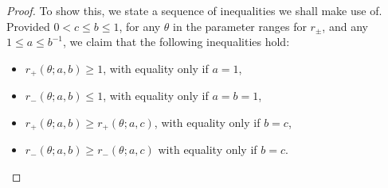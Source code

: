\documentclass[10pt,a4paper]{amsart}
\numberwithin{equation}{section}
\begin{document}
\begin{proof}
To show this, we state a sequence of inequalities we shall make use of. Provided $0 < c \leq b \leq 1$, for any $\theta$ in the parameter ranges for $r_{\pm}$, and any $1 \leq a \leq b^{-1}$, we claim that the following inequalities hold:
 \begin{itemize}\itemsep=0pt\samepage
 \item[$(i)$] $r_+(\theta;a,b) \geq 1$, with equality only if $a=1$,
 \item[$(ii)$] $r_-(\theta;a,b) \leq 1$, with equality only if $a=b=1$,
 \item[$(iii)$] $r_{+}(\theta;a,b) \geq r_{+}(\theta;a,c)$, with equality only if $b=c$,
 \item[$(iv)$] $r_{-}(\theta;a,b) \geq r_{-}(\theta;a,c)$ with equality only if $b=c$.
 \end{itemize}


\end{proof}
\end{document}
